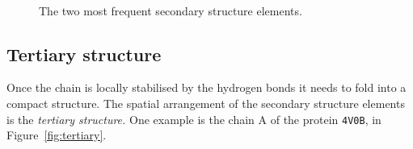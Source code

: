 \begin{figure}[hb]
	\centering
	\\
	\caption{The two most frequent secondary structure elements.}\label{fig:alpha_beta}
\end{figure}


\subsection{Tertiary structure}
Once the chain is locally stabilised by the hydrogen bonds it needs to fold into a compact structure.
The spatial arrangement of the secondary structure elements is the \emph{tertiary structure.}
One example is the chain A of the protein \texttt{4V0B}, in Figure~\ref{fig:tertiary}.

